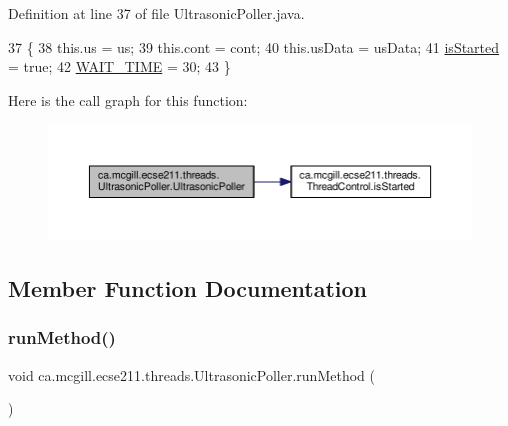 Definition at line 37 of file Ultrasonic\+Poller.\+java.


\begin{DoxyCode}
37                                                                               \{
38     this.us = us;
39     this.cont = cont;
40     this.usData = usData;
41     \hyperlink{classca_1_1mcgill_1_1ecse211_1_1threads_1_1_thread_control_a92f4933511db42476e39956246bcf2fe}{isStarted} = \textcolor{keyword}{true};
42     \hyperlink{classca_1_1mcgill_1_1ecse211_1_1threads_1_1_thread_control_a395cfe1d73b3ef14da0830ed0a499f82}{WAIT\_TIME} = 30;
43   \}
\end{DoxyCode}
Here is the call graph for this function\+:\nopagebreak
\begin{figure}[H]
\begin{center}
\leavevmode
\includegraphics[width=350pt]{classca_1_1mcgill_1_1ecse211_1_1threads_1_1_ultrasonic_poller_ac561f5d04e2b655a4509de8453c0cd07_cgraph}
\end{center}
\end{figure}


\subsection{Member Function Documentation}
\mbox{\label{classca_1_1mcgill_1_1ecse211_1_1threads_1_1_ultrasonic_poller_a8e6a84342aedc1b72741dbc2e80148c4}} 
\subsubsection{\texorpdfstring{run\+Method()}{runMethod()}}
{\footnotesize\ttfamily void ca.\+mcgill.\+ecse211.\+threads.\+Ultrasonic\+Poller.\+run\+Method (\begin{DoxyParamCaption}{ }\end{DoxyParamCaption})\hspace{0.3cm}{\ttfamily [protected]}}

